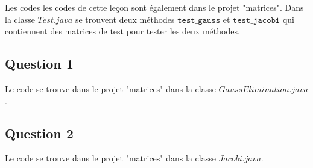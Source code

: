 Les codes les codes de cette leçon sont également dans le projet "matrices". Dans la classe $Test.java$ se trouvent deux méthodes $\texttt{test\_gauss}$ et $\texttt{test\_jacobi}$ qui contiennent des matrices de test pour tester les deux méthodes.

\subsection{Question 1}
Le code se trouve dans le projet "matrices" dans la classe $GaussElimination.java$.


\subsection{Question 2}
Le code se trouve dans le projet "matrices" dans la classe $Jacobi.java$.
